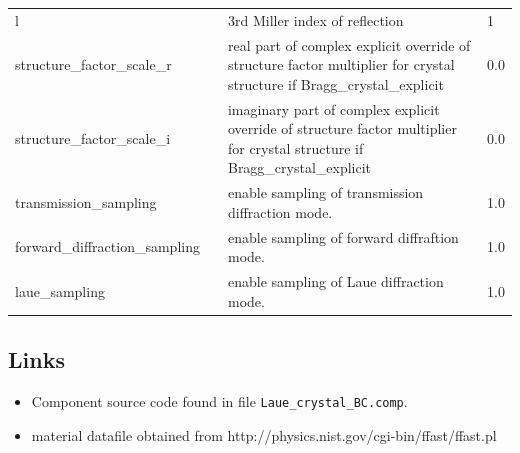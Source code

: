 \begin{longtable}{p{}p{}p{}p{}}
l &   & 3rd Miller index of reflection & 1 \\
structure\_factor\_scale\_r &   & real part of complex explicit override of structure factor multiplier for crystal structure if Bragg\_crystal\_explicit & 0.0 \\
structure\_factor\_scale\_i &   & imaginary part of complex explicit override of structure factor multiplier for crystal structure if Bragg\_crystal\_explicit & 0.0 \\
transmission\_sampling &   & enable sampling of transmission diffraction mode. & 1.0 \\
forward\_diffraction\_sampling &   & enable sampling of forward diffraftion mode. & 1.0 \\
laue\_sampling &   & enable sampling of Laue diffraction mode. & 1.0 \\
\bottomrule
\end{longtable}

\subsection*{Links}
\begin{itemize}
  \item Component source code found in file \texttt{Laue\_crystal\_BC.comp}.
  \item material datafile obtained from http://physics.nist.gov/cgi-bin/ffast/ffast.pl
\end{itemize}
